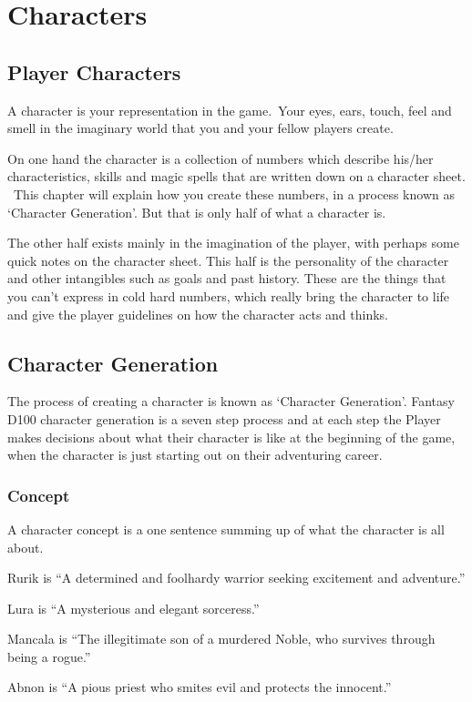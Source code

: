 \chapter{Characters}
\label{ch:characters}

\section{Player Characters}
A character is your representation in the game. Your eyes, ears, touch, feel and smell in the imaginary world that you and your fellow players create.

On one hand the character is a collection of numbers which describe his/her characteristics, skills and magic spells that are written down on a character sheet.  This chapter will explain how you create these numbers, in a process known as `Character Generation'. But that is only half of what a character is.

The other half exists mainly in the imagination of the player, with perhaps some quick notes on the character sheet. This half is the personality of the character and other intangibles such as goals and past history. These are the things that you can’t express in cold hard numbers, which really bring the character to life and give the player guidelines on how the character acts and thinks.


\section{Character Generation}
The process of creating a character is known as `Character Generation'. Fantasy D100 character generation is a seven step process and at each step the Player makes decisions about what their character is like at the beginning of the game, when the character is just starting out on their adventuring career. 

\subsection{Concept}
A character concept is a one sentence summing up of what the character is all about.

\begin{rpg-examplebox}
\begin{rpg-list}
\item Rurik is ``A determined and foolhardy warrior seeking excitement and adventure.''
\item Lura is ``A mysterious and elegant sorceress.''
\item Mancala is ``The illegitimate son of a murdered Noble, who survives through being a rogue.''
\item Abnon is ``A pious priest who smites evil and protects the innocent.''
\end{rpg-list}
\end{rpg-examplebox}

